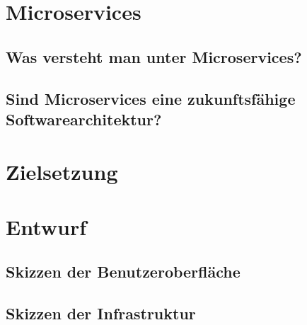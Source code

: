 \section{Microservices}

\subsection{Was versteht man unter Microservices?}

\subsection{Sind Microservices eine zukunftsfähige Softwarearchitektur?}

\section{Zielsetzung}

\section{Entwurf}

\subsection{Skizzen der Benutzeroberfläche}
\subsection{Skizzen der Infrastruktur}

